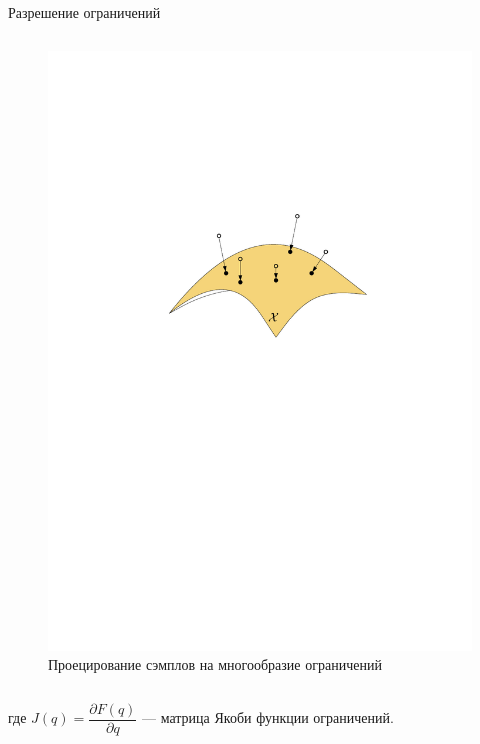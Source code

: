 \documentclass[11pt, aspectratio=169]{beamer}
\begin{document}
\begin{frame}{Разрешение ограничений}
\begin{columns}[onlytextwidth]
\begin{column}{0.39\textwidth}
\begin{figure}
                \includegraphics[width=1.0\textwidth]{figures/graph/projection.pdf}
                \caption{Проецирование сэмплов на многообразие ограничений}
                \label{fig:proj_sampling}
            \end{figure}
        \end{column}
    \end{columns}
    где $J(q) = \dfrac{\partial F(q)}{\partial q}$ --- матрица Якоби функции ограничений.
\end{frame}
\end{document}
